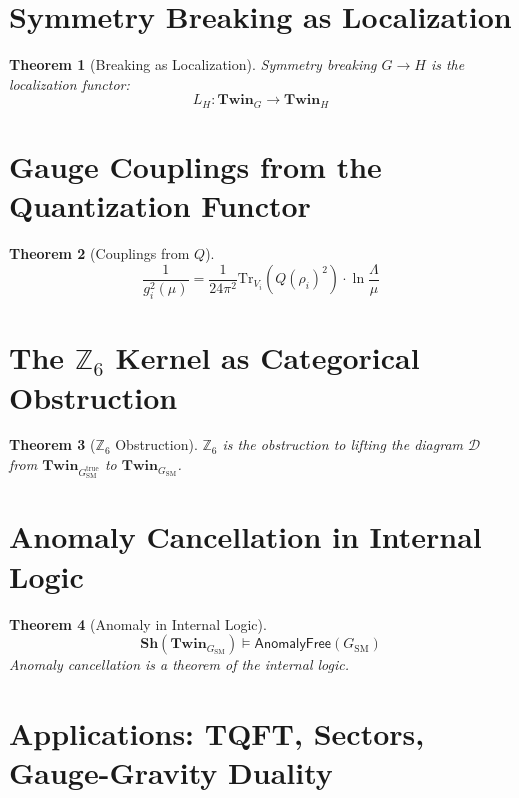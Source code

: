 \documentclass[11pt,a4paper,openright]{book}
\theoremstyle{plain}
\newtheorem{theorem}{Theorem}[chapter]
\theoremstyle{definition}
\newcommand{\SM}{\mathrm{SM}}
\newcommand{\Tr}{\mathrm{Tr}}
\newcommand{\Z}{\mathbb{Z}}
\newcommand{\Twin}{\mathbf{Twin}}
\newcommand{\Sh}{\mathbf{Sh}}
\newcommand{\Lam}{\Lambda}
\begin{document}
\section{Symmetry Breaking as Localization}

\begin{theorem}[Breaking as Localization]
Symmetry breaking $G \to H$ is the localization functor:
\begin{equation}
L_H: \Twin_G \to \Twin_H
\end{equation}
\end{theorem}

\section{Gauge Couplings from the Quantization Functor}

\begin{theorem}[Couplings from $Q$]
\begin{equation}
\frac{1}{g_i^2(\mu)} = \frac{1}{24\pi^2} \Tr_{V_i}(Q(\rho_i)^2) \cdot \ln\frac{\Lam}{\mu}
\end{equation}
\end{theorem}

\section{The $\Z_6$ Kernel as Categorical Obstruction}

\begin{theorem}[$\Z_6$ Obstruction]
$\Z_6$ is the obstruction to lifting the diagram $\mathcal{D}$ from $\Twin_{G_{\SM}^{\mathrm{true}}}$ to $\Twin_{G_{\SM}}$.
\end{theorem}

\section{Anomaly Cancellation in Internal Logic}

\begin{theorem}[Anomaly in Internal Logic]
\begin{equation}
\Sh(\Twin_{G_{\SM}}) \models \mathsf{AnomalyFree}(G_{\SM})
\end{equation}
Anomaly cancellation is a theorem of the internal logic.
\end{theorem}

\section{Applications: TQFT, Sectors, Gauge-Gravity Duality}
\end{document}
